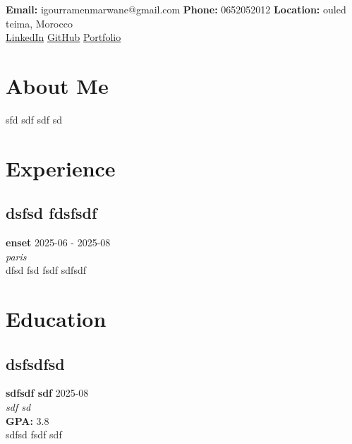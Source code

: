 \documentclass[11pt,a4paper]{article}
\begin{document}
\begin{center}
\end{center}

\vspace{1em}

\begin{center}
\textbf{Email:} igourramenmarwane@gmail.com \quad
\textbf{Phone:} 0652052012 \quad
\textbf{Location:} ouled teima, Morocco\\
\href{https://linkedin.com/in/yourprofile}{LinkedIn} \quad
\href{https://github.com/yourusername}{GitHub} \quad
\href{https://marwaneigourramen.com}{Portfolio}
\end{center}


\section{About Me}
sfd sdf sdf sd



\section{Experience}

\subsection{dsfsd fdsfsdf }
\textcolor{primary}{\textbf{enset}} \hfill \textcolor{secondary}{2025-06 - 2025-08}\\
\textit{paris}\\
dfsd fsd fsdf sdfsdf \\




\section{Education}

\subsection{dsfsdfsd}
\textcolor{primary}{\textbf{sdfsdf sdf}} \hfill \textcolor{secondary}{2025-08}\\
\textit{sdf sd}\\
\textbf{GPA:} 3.8\\
sdfsd fsdf sdf \\
\end{document}
